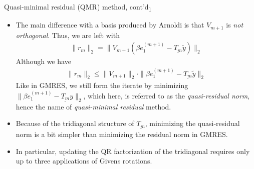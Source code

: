 \documentclass[t,usepdftitle=false]{beamer}
\begin{document}
\begin{frame}{Quasi-minimal residual (QMR) method, cont'd\textsubscript{1}}
\begin{itemize}
\item[] The main difference with a basis produced by Arnoldi is that $V_{m+1}$ is \textit{not orthogonal}.
Thus, we are left with
\begin{align*}
\|r_m\|_2=\|V_{m+1}(\beta e_1^{(m+1)}-\underline{T_m}\tilde{y})\|_2
\end{align*}
Although we have
\begin{align*}
\|r_m\|_2\leq\|V_{m+1}\|_2\cdot\|\beta e_1^{(m+1)}-\underline{T_m}\tilde{y}\|_2
\end{align*}
Like in GMRES, we still form the iterate by minimizing $\|\beta e_1^{(m+1)}-\underline{T_m}y\|_2$, which here, is referred to as the \textit{quasi-residual norm}, hence the name of \textit{quasi-minimal residual} method.
\item Because of the tridiagonal structure of $\underline{T_m}$, minimizing the quasi-residual norm is a bit simpler than minimizing the residual norm in GMRES.
\item[] In particular, updating the QR factorization of the tridiagonal requires only up to three applications of Givens rotations.
\end{itemize}
\end{frame}
\end{document}
